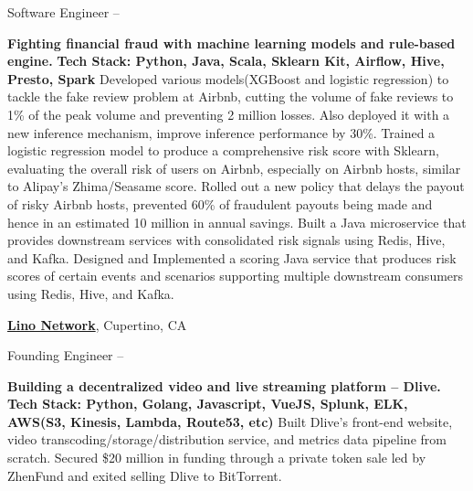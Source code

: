 \documentclass[a4paper,MMMyyyy,nonstopmode]{simpleresumecv}
\begin{document}
\begin{Body}
\Gap
\BulletItem
Software Engineer
\hfill
{} --
\begin{Detail}
\SubBulletItem
\textbf{Fighting financial fraud with machine learning models and rule-based engine.}
\SubBulletItem \textbf{Tech Stack: Python, Java, Scala, Sklearn Kit, Airflow, Hive, Presto, Spark}
\SubBulletItem
Developed various models(XGBoost and logistic regression) to tackle the fake review problem at Airbnb, cutting the volume of fake reviews to 1\% of the peak volume and preventing 2 million losses. Also deployed it with a new inference mechanism, improve inference performance by 30\%.
\SubBulletItem
Trained a logistic regression model to produce a comprehensive risk score with Sklearn, evaluating the overall risk of users on Airbnb, especially on Airbnb hosts, similar to Alipay's Zhima/Seasame score.
\SubBulletItem
Rolled out a new policy that delays the payout of risky Airbnb hosts, prevented 60\% of fraudulent payouts being made and hence in an estimated 10 million in annual savings.
\SubBulletItem
Built a Java microservice that provides downstream services with consolidated risk signals using Redis, Hive, and Kafka.
\SubBulletItem
Designed and Implemented a scoring Java service that produces risk scores of certain events and scenarios supporting multiple downstream consumers using Redis, Hive, and Kafka.
\end{Detail}

\BigGap
\Entry
\href{https://lino.network/}
{\textbf{Lino Network}},
Cupertino, CA

\Gap
\BulletItem
Founding Engineer
\hfill
{} --

\begin{Detail}
\SubBulletItem \textbf{Building a decentralized video and live streaming platform -- Dlive.}
\SubBulletItem \textbf{Tech Stack: Python, Golang, Javascript, VueJS, Splunk, ELK, AWS(S3, Kinesis, Lambda, Route53, etc)}
\SubBulletItem 
Built Dlive's front-end website, video transcoding/storage/distribution service, and metrics data pipeline from scratch.
\SubBulletItem
Secured \$20 million in funding through a private token sale led by ZhenFund and exited selling Dlive to BitTorrent.
\end{Detail}



\end{Body}
\end{document}
